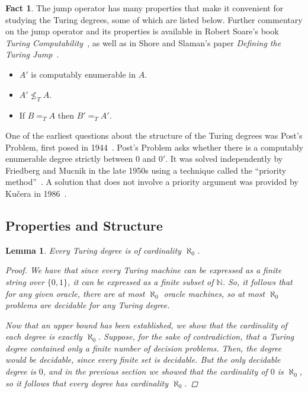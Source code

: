\documentclass[psamsfonts]{amsart}
\newtheorem{lem}[thm]{Lemma}
\newtheorem{prob}[thm]{Problem}
\theoremstyle{definition}
\newtheorem{fact}[thm]{Fact}
\theoremstyle{remark}
\numberwithin{equation}{section}
\begin{document}
\begin{fact}
  The jump operator has many properties that make it convenient for studying the
Turing degrees, some of which are listed below. Further commentary on the jump operator
and its properties is available in Robert Soare's book \emph{Turing
  Computability}~\cite{soare16_turin_comput}, as well as in Shore and Slaman's
paper \emph{Defining the Turing Jump}~\cite{shore99:_defin_turin_jump}.
  \begin{itemize}
  \item $A'$ is computably enumerable in $A$.
  \item $A' \not\leq_T A$.
  \item If $B=_TA$ then $B'=_TA'$.
  \end{itemize}
\end{fact}

One of the earliest questions about the structure of the Turing degrees was
Post's Problem, first posed in 1944~\cite{post44:_recur}. Post's Problem asks
whether there is a computably enumerable degree strictly between $0$ and $0'$. It was solved
independently by Friedberg and Mucnik in the late 1950s using a technique
called the ``priority method''~\cite{Friedberg236, muchnik1956unsolvability}. A solution that does not
involve a priority argument was provided by Ku\v{c}era in 1986~\cite{Kucera:1986:APS:22416.22462}.


\subsection{Properties and Structure}


\begin{lem}
  \label{lem:deg_count}
  Every Turing degree is of cardinality $\aleph_0$.
  \begin{proof}
    We have that since every Turing machine can be expressed as a finite string over
    $\{0,1\}$, it can be expressed as a finite subset of $\mathbb{N}$. So, it follows
    that for any given oracle, there are at most $\aleph_0$ oracle machines, so
    at most $\aleph_0$ problems are decidable for any Turing degree.
    \par
    Now that an upper bound has been established, we show that the cardinality
    of each degree is exactly $\aleph_0$. Suppose, for the sake of contradiction,
    that a Turing degree contained only a finite number of decision
    problems. Then, the degree would be decidable, since every finite set is
    decidable. But the only decidable degree is $0$, and in the previous section we
    showed that the cardinality of $0$ is $\aleph_0$, so it follows that every
    degree has cardinality $\aleph_0$.
  \end{proof}
\end{lem}
\end{document}
